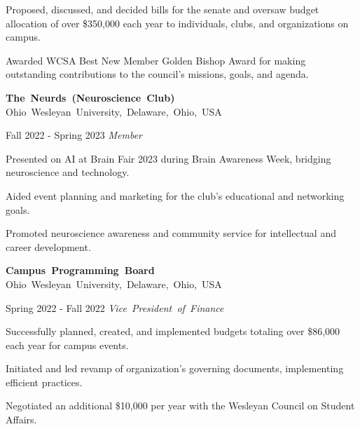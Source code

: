 \documentclass[10pt, letterpaper]{article}
\begin{document}
\vspace{\highlightSpacing}
\begin{onecolentry}
    \begin{highlights}
        \item Proposed, discussed, and decided bills for the senate and oversaw budget allocation of over \$350,000 each year to individuals, clubs, and organizations on campus.
        \item Awarded WCSA Best New Member Golden Bishop Award for making outstanding contributions to the council's missions, goals, and agenda.
    \end{highlights}
\end{onecolentry}

\vspace{\entrySpacing}
\mbox{\textbf{The Neurds (Neuroscience Club)}}
\kern {}
\AND
\kern {}
\mbox{Ohio Wesleyan University, Delaware, Ohio, USA}

\vspace{\highlightSpacing}
\begin{twocolentry}{Fall 2022 - Spring 2023}
    \mbox{\textit{Member}}
\end{twocolentry}

\vspace{\highlightSpacing}
\begin{onecolentry}
    \begin{highlights}
        \item Presented on AI at Brain Fair 2023 during Brain Awareness Week, bridging neuroscience and technology.
        \item Aided event planning and marketing for the club's educational and networking goals.
        \item Promoted neuroscience awareness and community service for intellectual and career development.
    \end{highlights}
\end{onecolentry}

\vspace{\entrySpacing}
\mbox{\textbf{Campus Programming Board}}
\kern {}
\AND
\kern {}
\mbox{Ohio Wesleyan University, Delaware, Ohio, USA}

\vspace{\highlightSpacing}
\begin{twocolentry}{Spring 2022 - Fall 2022}
    \mbox{\textit{Vice President of Finance}}
\end{twocolentry}
\begin{onecolentry}
    \begin{highlights}
        \item Successfully planned, created, and implemented budgets totaling over \$86,000 each year for campus events.
        \item Initiated and led revamp of organization's governing documents, implementing efficient practices.
        \item Negotiated an additional \$10,000 per year with the Wesleyan Council on Student Affairs.
    \end{highlights}
\end{onecolentry}
\end{document}
